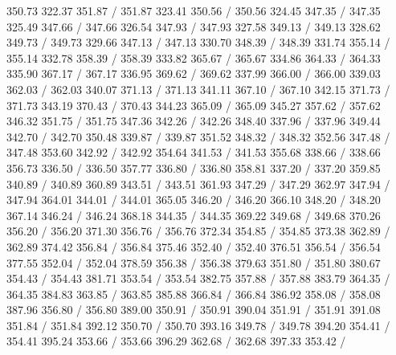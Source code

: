 { 350.73 322.37 351.87 /
 351.87 323.41 350.56 /
 350.56 324.45 347.35 /
 347.35 325.49 347.66 /
 347.66 326.54 347.93 /
 347.93 327.58 349.13 /
 349.13 328.62 349.73 /
 349.73 329.66 347.13 /
 347.13 330.70 348.39 /
 348.39 331.74 355.14 /
 355.14 332.78 358.39 /
 358.39 333.82 365.67 /
 365.67 334.86 364.33 /
 364.33 335.90 367.17 /
 367.17 336.95 369.62 /
 369.62 337.99 366.00 /
 366.00 339.03 362.03 /
 362.03 340.07 371.13 /
 371.13 341.11 367.10 /
 367.10 342.15 371.73 /
 371.73 343.19 370.43 /
 370.43 344.23 365.09 /
 365.09 345.27 357.62 /
 357.62 346.32 351.75 /
 351.75 347.36 342.26 /
 342.26 348.40 337.96 /
 337.96 349.44 342.70 /
 342.70 350.48 339.87 /
 339.87 351.52 348.32 /
 348.32 352.56 347.48 /
 347.48 353.60 342.92 /
 342.92 354.64 341.53 /
 341.53 355.68 338.66 /
 338.66 356.73 336.50 /
 336.50 357.77 336.80 /
 336.80 358.81 337.20 /
 337.20 359.85 340.89 /
 340.89 360.89 343.51 /
 343.51 361.93 347.29 /
 347.29 362.97 347.94 /
 347.94 364.01 344.01 /
 344.01 365.05 346.20 /
 346.20 366.10 348.20 /
 348.20 367.14 346.24 /
 346.24 368.18 344.35 /
 344.35 369.22 349.68 /
 349.68 370.26 356.20 /
 356.20 371.30 356.76 /
 356.76 372.34 354.85 /
 354.85 373.38 362.89 /
 362.89 374.42 356.84 /
 356.84 375.46 352.40 /
 352.40 376.51 356.54 /
 356.54 377.55 352.04 /
 352.04 378.59 356.38 /
 356.38 379.63 351.80 /
 351.80 380.67 354.43 /
 354.43 381.71 353.54 /
 353.54 382.75 357.88 /
 357.88 383.79 364.35 /
 364.35 384.83 363.85 /
 363.85 385.88 366.84 /
 366.84 386.92 358.08 /
 358.08 387.96 356.80 /
 356.80 389.00 350.91 /
 350.91 390.04 351.91 /
 351.91 391.08 351.84 /
 351.84 392.12 350.70 /
 350.70 393.16 349.78 /
 349.78 394.20 354.41 /
 354.41 395.24 353.66 /
 353.66 396.29 362.68 /
 362.68 397.33 353.42 /
}
